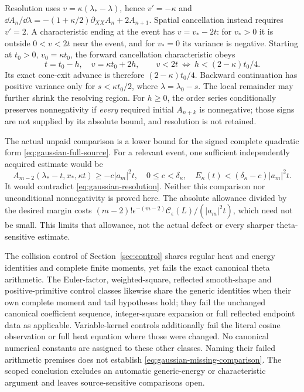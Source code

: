 Resolution uses \(v=\kappa(\lambda_*-\lambda)\), hence \(v'=-\kappa\)
and \(\dd A_n/\dd\lambda=-(1+\kappa/2)\partial_{XX}A_n+2A_{n+1}\).
Spatial cancellation instead requires \(v'=2\). A characteristic
ending at the event has \(v=v_*-2t\): for \(v_*>0\) it is outside
\(0<v<2t\) near the event, and for \(v_*=0\) its variance is negative.
Starting at \(t_0>0\), \(v_0=\kappa t_0\), the forward cancellation
characteristic obeys
\begin{equation}\label{eq:gaussian-cone-exit}
 t=t_0-h,\quad v=\kappa t_0+2h,\qquad
 v<2t\ \Longleftrightarrow\ h<(2-\kappa)t_0/4.
\end{equation}
Its exact cone-exit advance is therefore \((2-\kappa)t_0/4\).
Backward continuation has positive variance only for
\(s<\kappa t_0/2\), where \(\lambda=\lambda_0-s\).
The local remainder may further shrink the resolving region.
For \(h\ge0\), the order series conditionally preserves nonnegativity
if \emph{every} required initial \(A_{n+k}\) is nonnegative; those signs
are not supplied by its absolute bound, and resolution is not retained.

The actual unpaid comparison is a lower bound for the signed complete
quadratic form \eqref{eq:gaussian-full-source}. For a relevant event,
one sufficient independently acquired estimate would be
\begin{equation}\label{eq:gaussian-missing-comparison}
 A_{m-2}(\lambda_*-t,x_*,\kappa t)\ge-c|a_m|^2t,
 \quad0\le c<\delta_\kappa,\quad
 E_\kappa(t)<(\delta_\kappa-c)|a_m|^2t.
\end{equation}
It would contradict \eqref{eq:gaussian-resolution}. Neither this
comparison nor unconditional nonnegativity is proved here.
The absolute allowance divided by the desired margin costs
\((m-2)!\epsilon^{-(m-2)}\mathcal C_\epsilon(L)/(|a_m|^2t)\),
which need not be small. This limits that allowance, not the actual
defect or every sharper theta-sensitive estimate.

The collision control of Section~\ref{sec:control} shares regular heat
and energy identities and complete finite moments, yet fails the exact
canonical theta arithmetic. The Euler-factor, weighted-square,
reflected smooth-shape and positive-primitive control classes likewise
share the generic identities when their own complete moment and tail
hypotheses hold; they fail the unchanged canonical coefficient sequence,
integer-square expansion or full reflected endpoint data as applicable.
Variable-kernel controls additionally fail the literal cosine observation
or full heat equation where those were changed. No canonical numerical
constants are assigned to these other classes. Naming their failed
arithmetic premises does not establish
\eqref{eq:gaussian-missing-comparison}. The scoped conclusion excludes an
automatic generic-energy or characteristic argument and leaves
source-sensitive comparisons open.
